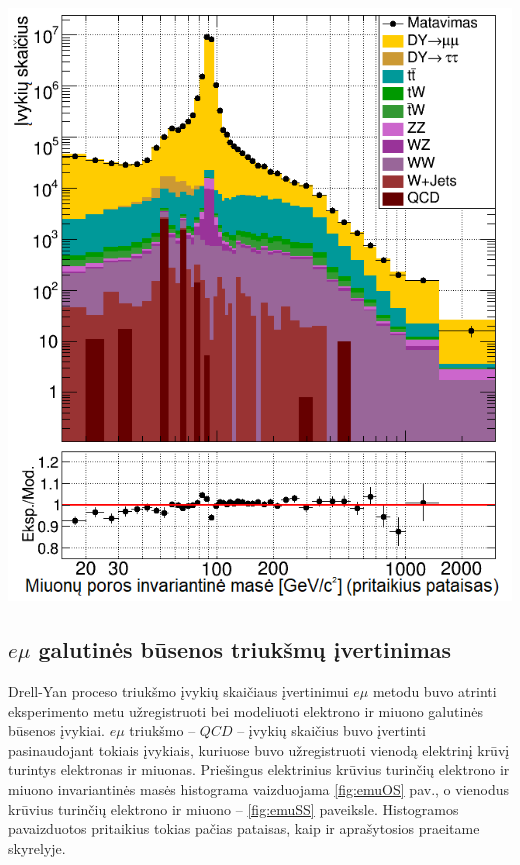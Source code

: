\documentclass[a4paper, 12pt]{article}
\newcommand{\emu}{e\mu}
\newcommand{\QCD}{QC\! D}
\begin{document}
\begin{centering}
\begin{minipage}[t]{0.49\linewidth}
		\includegraphics[width=1\linewidth]{mumuMassAfter_SMALL.png}
	\end{minipage}
	\vspace{-0.3cm}
\end{centering}


\subsection{$e\mu$ galutinės būsenos triukšmų įvertinimas}

Drell-Yan proceso triukšmo įvykių skaičiaus įvertinimui $\emu$ metodu buvo atrinti eksperimento metu užregistruoti bei
modeliuoti elektrono ir miuono galutinės būsenos įvykiai.
$\emu$ triukšmo -- $\QCD$ -- įvykių skaičius buvo įvertinti pasinaudojant tokiais įvykiais, kuriuose buvo užregistruoti
vienodą elektrinį krūvį turintys elektronas ir miuonas.
Priešingus elektrinius krūvius turinčių elektrono ir miuono invariantinės masės histograma vaizduojama \ref{fig:emuOS}
pav., o vienodus krūvius turinčių elektrono ir miuono -- \ref{fig:emuSS} paveiksle.
Histogramos pavaizduotos pritaikius tokias pačias pataisas, kaip ir aprašytosios praeitame skyrelyje.
\end{document}
